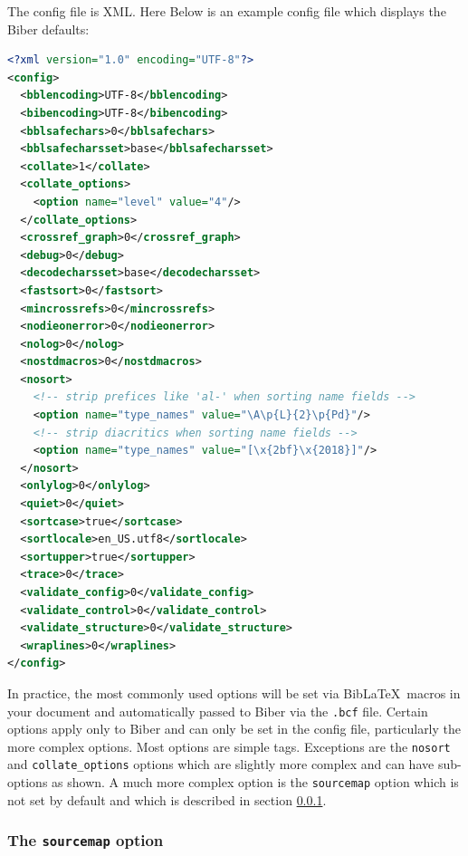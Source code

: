 \documentclass{ltxdockit}
\begin{document}
\noindent The config file is XML. Here Below is
an example config file which displays the Biber defaults:

\begin{lstlisting}[language=xml]
<?xml version="1.0" encoding="UTF-8"?>
<config>
  <bblencoding>UTF-8</bblencoding>
  <bibencoding>UTF-8</bibencoding>
  <bblsafechars>0</bblsafechars>
  <bblsafecharsset>base</bblsafecharsset>
  <collate>1</collate>
  <collate_options>
    <option name="level" value="4"/>
  </collate_options>
  <crossref_graph>0</crossref_graph>
  <debug>0</debug>
  <decodecharsset>base</decodecharsset>
  <fastsort>0</fastsort>
  <mincrossrefs>0</mincrossrefs>
  <nodieonerror>0</nodieonerror>
  <nolog>0</nolog>
  <nostdmacros>0</nostdmacros>
  <nosort>
    <!-- strip prefices like 'al-' when sorting name fields -->
    <option name="type_names" value="\A\p{L}{2}\p{Pd}"/>
    <!-- strip diacritics when sorting name fields -->
    <option name="type_names" value="[\x{2bf}\x{2018}]"/>
  </nosort>
  <onlylog>0</onlylog>
  <quiet>0</quiet>
  <sortcase>true</sortcase>
  <sortlocale>en_US.utf8</sortlocale>
  <sortupper>true</sortupper>
  <trace>0</trace>
  <validate_config>0</validate_config>
  <validate_control>0</validate_control>
  <validate_structure>0</validate_structure>
  <wraplines>0</wraplines>
</config>
\end{lstlisting}

\noindent In practice, the most commonly used options will be set via
Bib\LaTeX\ macros in your document and automatically passed to Biber
via the \verb+.bcf+ file. Certain options apply only to Biber and can
only be set in the config file, particularly the more complex
options. Most options are simple tags. Exceptions are the
\verb+nosort+ and \verb+collate_options+ options which are slightly
more complex and can have sub-options as shown. A much more complex
option is the \verb+sourcemap+ option which is not set by default and
which is described in section \ref{map}.

\subsubsection{The \texttt{sourcemap} option}\label{map}
\end{document}
